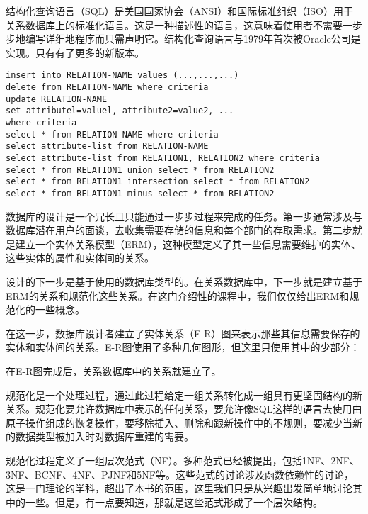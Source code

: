 结构化查询语言（SQL）是美国国家协会（ANSI）和国际标准组织（ISO）用于关系数据库上的标准化语言。这是一种描述性的语言，这意味着使用者不需要一步步地编写详细地程序而只需声明它。结构化查询语言与1979年首次被Oracle公司是实现。只有有了更多的新版本。
\begin{verbatim}
insert into RELATION-NAME values (...,...,...)
delete from RELATION-NAME where criteria
update RELATION-NAME
set attributel=valuel, attribute2=value2, ...
where criteria
select * from RELATION-NAME where criteria
select attribute-list from RELATION-NAME
select attribute-list from RELATION1, RELATION2 where criteria
select * from RELATION1 union select * from RELATION2
select * from RELATION1 intersection select * from RELATION2
select * from RELATION1 minus select * from RELATION2
\end{verbatim}

数据库的设计是一个冗长且只能通过一步步过程来完成的任务。第一步通常涉及与数据库潜在用户的面谈，去收集需要存储的信息和每个部门的存取需求。第二步就是建立一个实体关系模型（ERM），这种模型定义了其一些信息需要维护的实体、这些实体的属性和实体间的关系。 

设计的下一步是基于使用的数据库类型的。在关系数据库中，下一步就是建立基于ERM的关系和规范化这些关系。在这门介绍性的课程中，我们仅仅给出ERM和规范化的一些概念。 

在这一步，数据库设计者建立了实体关系（E-R）图来表示那些其信息需要保存的实体和实体间的关系。E-R图使用了多种几何图形，但这里只使用其中的少部分： 

在E-R图完成后，关系数据库中的关系就建立了。

规范化是一个处理过程，通过此过程给定一组关系转化成一组具有更坚固结构的新关系。规范化要允许数据库中表示的任何关系，要允许像SQL这样的语言去使用由原子操作组成的恢复操作，要移除插入、删除和跟新操作中的不规则，要减少当新的数据类型被加入时对数据库重建的需要。

规范化过程定义了一组层次范式（NF）。多种范式已经被提出，包括1NF、2NF、3NF、BCNF、4NF、PJNF和5NF等。这些范式的讨论涉及函数依赖性的讨论，这是一门理论的学科，超出了本书的范围，这里我们只是从兴趣出发简单地讨论其中的一些。但是，有一点要知道，那就是这些范式形成了一个层次结构。
